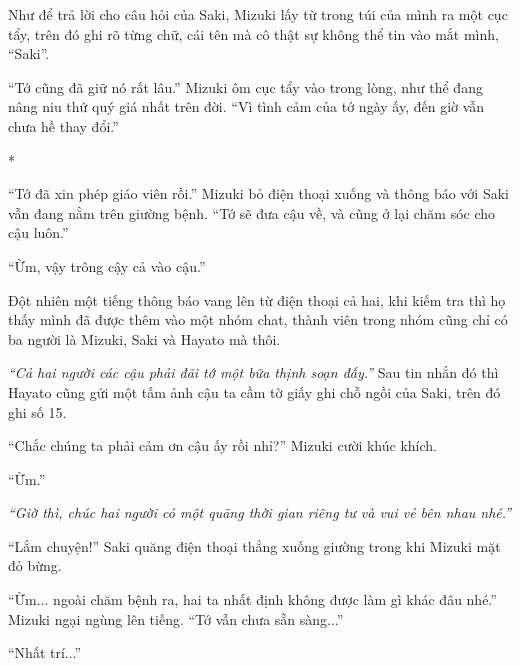 {Như để trả lời cho câu hỏi của Saki, Mizuki lấy từ trong túi của mình ra
một cục tẩy, trên đó ghi rõ từng chữ, cái tên mà cô thật sự không thể
tin vào mắt mình, ``Saki''.

``Tớ cũng đã giữ nó rất lâu.'' Mizuki ôm cục tẩy vào trong lòng, như thể
đang nâng niu thứ quý giá nhất trên đời. ``Vì tình cảm của tớ ngày ấy,
đến giờ vẫn chưa hề thay đổi.''

*

``Tớ đã xin phép giáo viên rồi.'' Mizuki bỏ điện thoại xuống và thông
báo với Saki vẫn đang nằm trên giường bệnh. ``Tớ sẽ đưa cậu về, và cũng
ở lại chăm sóc cho cậu luôn.''

``Ừm, vậy trông cậy cả vào cậu.''

Đột nhiên một tiếng thông báo vang lên từ điện thoại cả hai, khi kiếm
tra thì họ thấy mình đã được thêm vào một nhóm chat, thành viên trong
nhóm cũng chỉ có ba người là Mizuki, Saki và Hayato mà thôi.

\emph{``Cả hai người các cậu phải đãi tớ một bữa thịnh soạn đấy.''} Sau
tin nhắn đó thì Hayato cũng gửi một tấm ảnh cậu ta cầm tờ giấy ghi chỗ
ngồi của Saki, trên đó ghi số 15.

``Chắc chúng ta phải cảm ơn cậu ấy rồi nhỉ?'' Mizuki cười khúc khích.

``Ừm.''

\emph{``Giờ thì, chúc hai người có một quãng thời gian riêng tư và vui
vẻ bên nhau nhé.''}

``Lắm chuyện!'' Saki quăng điện thoại thẳng xuống giường trong khi
Mizuki mặt đỏ bừng.

``Ừm... ngoài chăm bệnh ra, hai ta nhất định không được làm gì khác đâu
nhé.'' Mizuki ngại ngùng lên tiếng. ``Tớ vẫn chưa sẵn sàng...''

``Nhất trí...''

}